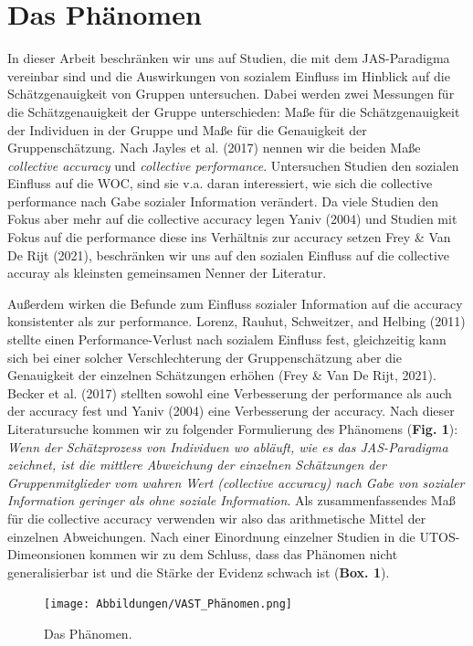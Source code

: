 \documentclass[
  man,floatsintext]{apa6}
\begin{document}
\section{Das Phänomen}\label{das-phuxe4nomen}

In dieser Arbeit beschränken wir uns auf Studien, die mit dem JAS-Paradigma vereinbar sind und die Auswirkungen von sozialem Einfluss im Hinblick auf die Schätzgenauigkeit von Gruppen untersuchen. Dabei werden zwei Messungen für die Schätzgenauigkeit der Gruppe unterschieden: Maße für die Schätzgenauigkeit der Individuen in der Gruppe und Maße für die Genauigkeit der Gruppenschätzung. Nach Jayles et al. (2017) nennen wir die beiden Maße \emph{collective accuracy} und \emph{collective performance}. Untersuchen Studien den sozialen Einfluss auf die WOC, sind sie v.a. daran interessiert, wie sich die collective performance nach Gabe sozialer Information verändert. Da viele Studien den Fokus aber mehr auf die collective accuracy legen Yaniv (2004) und Studien mit Fokus auf die performance diese ins Verhältnis zur accuracy setzen Frey \& Van De Rijt (2021), beschränken wir uns auf den sozialen Einfluss auf die collective accuray als kleinsten gemeinsamen Nenner der Literatur.

Außerdem wirken die Befunde zum Einfluss sozialer Information auf die accuracy konsistenter als zur performance. Lorenz, Rauhut, Schweitzer, and Helbing (2011) stellte einen Performance-Verlust nach sozialem Einfluss fest, gleichzeitig kann sich bei einer solcher Verschlechterung der Gruppenschätzung aber die Genauigkeit der einzelnen Schätzungen erhöhen (Frey \& Van De Rijt, 2021). Becker et al. (2017) stellten sowohl eine Verbesserung der performance als auch der accuracy fest und Yaniv (2004) eine Verbesserung der accuracy. Nach dieser Literatursuche kommen wir zu folgender Formulierung des Phänomens (\textbf{Fig. 1}): \emph{Wenn der Schätzprozess von Individuen wo abläuft, wie es das JAS-Paradigma zeichnet, ist die mittlere Abweichung der einzelnen Schätzungen der Gruppenmitglieder vom wahren Wert (collective accuracy) nach Gabe von sozialer Information geringer als ohne soziale Information}. Als zusammenfassendes Maß für die collective accuracy verwenden wir also das arithmetische Mittel der einzelnen Abweichungen. Nach einer Einordnung einzelner Studien in die UTOS-Dimeonsionen kommen wir zu dem Schluss, dass das Phänomen nicht generalisierbar ist und die Stärke der Evidenz schwach ist (\textbf{Box. 1}).



\begin{figure}
\centering
\texttt{[image: Abbildungen/VAST\_Phänomen.png]}
\caption{\label{fig:my-figure}Das Phänomen.}
\end{figure}
\end{document}
